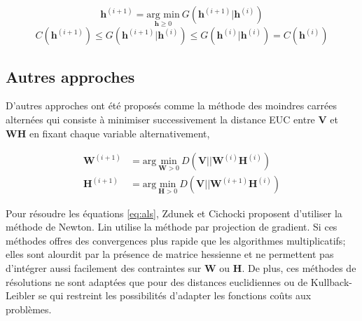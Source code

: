 \begin{equation}
\textbf{h}^{(i+1)} = \underset{\textbf{h} \geq 0}{\text{arg min}}~ G(\textbf{h}^{(i+1)}\vert \textbf{h}^{(i)})
\end{equation}
\begin{equation}
C(\mathbf{h}^{(i+1)}) \leq G(\textbf{h}^{(i+1)}\vert\mathbf{h}^{(i)}) \leq G(\textbf{h}^{(i)}\vert\mathbf{h}^{(i)}) = C(\mathbf{h}^{(i)})
\end{equation}

\subsection{Autres approches}

D'autres approches ont été proposés comme la méthode des moindres carrées alternées \cite{cichocki_regularized_2007} \cite{berry_algorithms_2007} qui consiste à minimiser successivement la distance EUC entre $\mathbf{V}$ et $\mathbf{WH}$ en fixant chaque variable alternativement, 

\begin{subequations}\label{eq:als}
\begin{align}
\mathbf{W}^{(i+1)} &= \text{arg}~\underset{\mathbf{W} > 0}{\text{min}}~D\left(\mathbf{V} \vert\vert\mathbf{W}^{(i)}\mathbf{H}^{(i)}\right)\\
\mathbf{H}^{(i+1)} &= \text{arg}~\underset{\mathbf{H} > 0}{\text{min}}~D\left(\mathbf{V} \vert\vert\mathbf{W}^{(i+1)}\mathbf{H}^{(i)}\right)
\end{align}
\end{subequations}

Pour résoudre les équations \ref{eq:als}, Zdunek et Cichocki \cite{zdunek2006non} proposent d'utiliser la méthode de Newton. Lin \cite{lin_projected_2007} utilise la méthode par projection de gradient. Si ces méthodes offres des convergences plus rapide que les algorithmes multiplicatifs; elles sont alourdit par la présence de matrice hessienne et ne permettent pas d'intégrer aussi facilement des contraintes sur $\mathbf{W}$ ou $\mathbf{H}$. De plus, ces méthodes de résolutions ne sont adaptées que pour des distances euclidiennes ou de Kullback-Leibler se qui restreint les possibilités d'adapter les fonctions coûts aux problèmes.\\





